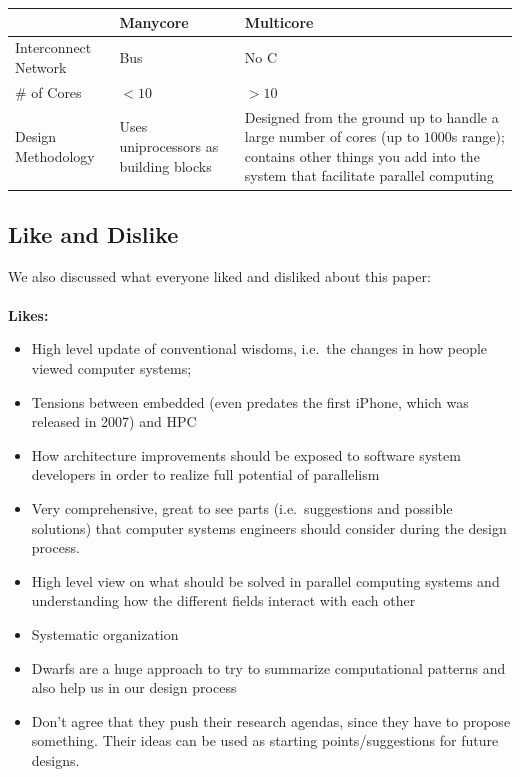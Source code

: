 \begin{center}
    \begin{tabular}{p{5cm} p{5cm} p{5cm}}
        \toprule
        & Manycore & Multicore \\
        \midrule
        Interconnect Network & Bus & No C \\
        \# of Cores & \( <10 \) & \( >10 \) \\
        Design Methodology & Uses uniprocessors as building blocks & Designed from the ground up to handle a large number of cores (up to \( 1000 \)s range); contains other things you add into the system that facilitate parallel computing \\
        \bottomrule
    \end{tabular}
\end{center}

\subsection{Like and Dislike}\label{feb-11:a-view:like-dislike}
We also discussed what everyone liked and disliked about this paper:
\\ \\
\textbf{Likes:}

\begin{itemize}
    \item High level update of conventional wisdoms, i.e.\ the changes in how people viewed computer systems;
    \item Tensions between embedded (even predates the first iPhone, which was released in 2007) and HPC
    \item How architecture improvements should be exposed to software system developers in order to realize full potential of parallelism
    \item Very comprehensive, great to see parts (i.e.\ suggestions and possible solutions) that computer systems engineers should consider during the design process.
    \item High level view on what should be solved in parallel computing systems and understanding how the different fields interact with each other
    \item Systematic organization
    \item Dwarfs are a huge approach to try to summarize computational patterns and also help us in our design process
    \item Don't agree that they push their research agendas, since they have to propose something.
    Their ideas can be used as starting points/suggestions for future designs.
\end{itemize}

